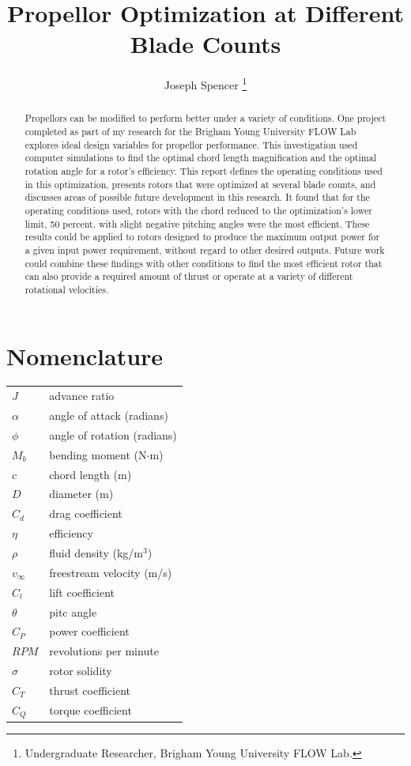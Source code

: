 \documentclass[journal ]{new-aiaa}
\title{Propellor Optimization at Different Blade Counts}
\author{Joseph Spencer \footnote{Undergraduate Researcher, Brigham Young University FLOW Lab.}}
\affil{Brigham Young University, Provo, Utah, 84601}
\begin{document}
\maketitle

\begin{abstract}

Propellors can be modified to perform better under a variety of conditions. One project completed as part of my research for the Brigham Young University FLOW Lab explores ideal design variables for propellor performance. This investigation used computer simulations to find the optimal chord length magnification and the optimal rotation angle for a rotor's efficiency. This report defines the operating conditions used in this optimization, presents rotors that were optimized at several blade counts, and discusses areas of possible future development in this research. It found that for the operating conditions used, rotors with the chord reduced to the optimization's lower limit, 50 percent, with slight negative pitching angles were the most efficient. These results could be applied to rotors designed to produce the maximum output power for a given input power requirement, without regard to other desired outputs. Future work could combine these findings with other conditions to find the most efficient rotor that can also provide a required amount of thrust or operate at a variety of different rotational velocities.

\end{abstract}


\section*{Nomenclature}

{\renewcommand\arraystretch{1.0}
\noindent\begin{longtable*}{@{}l @{\quad \quad} l@{}}

$J$ & advance ratio \\
$\alpha$ & angle of attack (radians) \\
$\phi$ & angle of rotation (radians) \\
$M_{b}$ & bending moment (N$\cdot$m) \\
$c$ & chord length (m) \\
$D$ & diameter (m) \\
$C_{d}$ & drag coefficient \\
$\eta$ & efficiency \\
$\rho$ & fluid density (kg/m$^{3}$) \\
$v_{\infty}$ & freestream velocity (m/s) \\
$C_{l}$ & lift coefficient \\
$\theta$ & pitc angle \\
$C_{P}$ & power coefficient \\
$RPM$ & revolutions per minute \\
$\sigma$ & rotor solidity \\
$C_{T}$ & thrust coefficient \\
$C_{Q}$ & torque coefficient \\

\end{longtable*}}
\end{document}
